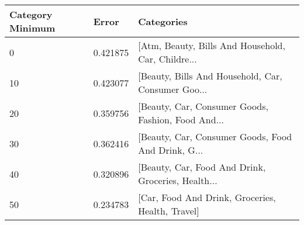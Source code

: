 \begin{tabular}{p{2cm}|p{2cm}|p{9cm}}
\toprule
 Category Minimum &    Error &                                         Categories \\
\midrule
                0 & 0.421875 & [Atm, Beauty, Bills And Household, Car, Childre... \\
               10 & 0.423077 & [Beauty, Bills And Household, Car, Consumer Goo... \\
               20 & 0.359756 & [Beauty, Car, Consumer Goods, Fashion, Food And... \\
               30 & 0.362416 & [Beauty, Car, Consumer Goods, Food And Drink, G... \\
               40 & 0.320896 & [Beauty, Car, Food And Drink, Groceries, Health... \\
               50 & 0.234783 &   [Car, Food And Drink, Groceries, Health, Travel] \\
\bottomrule
\end{tabular}
